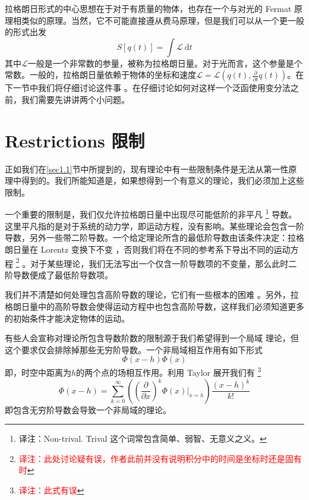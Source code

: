 拉格朗日形式的中心思想在于对于有质量的物体，也存在一个与对光的 Fermat 原理相类似的原理。当然，它不可能直接遵从费马原理，但是我们可以从一个更一般的形式出发
\[
S[q(t)]=\int {\mathcal L}~{\mathrm d}t
\]
其中\(\mathcal L\)一般是一个非常数的参量，被称为拉格朗日量。对于光而言，这个参量是个常数。一般的，拉格朗日量依赖于物体的坐标和速度\({\mathcal L}={\mathcal L}(q(t),\frac{\partial}{\partial t} q(t))\)。在下一节中我们将仔细讨论这件事%
%
。在仔细讨论如何对这样一个泛函使用变分法之前，我们需要先讲讲两个小问题。

\section[限制]{Restrictions 限制}\label{sec4.2}
正如我们在\ref{sec1.1}节中所提到的，现有理论中有一些限制条件是无法从第一性原理中得到的。我们所能知道是，如果想得到一个有意义的理论，我们必须加上这些限制。

一个重要的限制是，我们仅允许拉格朗日量中出现尽可能低阶的非平凡%
\footnote{译注：Non-trival. Trival 这个词常包含简单、弱智、无意义之义。}%
导数。这里平凡指的是对于系统的动力学，即运动方程，没有影响。某些理论会包含一阶导数，另外一些带二阶导数。一个给定理论所含的最低阶导数由该条件决定：拉格朗日量在 Lorentz 变换下不变%
%
，否则我们将在不同的参考系下导出不同的运动方程%
\footnote{\textcolor{red}{译注：此处讨论疑有误，作者此前并没有说明积分中的时间是坐标时还是固有时}}%
。对于某些理论，我们无法写出一个仅含一阶导数项的不变量，那么此时二阶导数便成了最低阶导数项。

我们并不清楚如何处理包含高阶导数的理论，它们有一些根本的困难%
%
。另外，拉格朗日量中的高阶导数会使得运动方程中也包含高阶导数，这样我们必须知道更多的初始条件才能决定物体的运动。

有些人会宣称对理论所包含导数阶数的限制源于我们希望得到一个局域%
%
理论，但这个要求仅会排除掉那些无穷阶导数。一个非局域相互作用有如下形式%
\begin{equation}
\Phi(x-h)\Phi(x)
\end{equation}
即，时空中距离为\(h\)的两个点的场相互作用。利用 Taylor 展开我们有%
\footnote{\textcolor{red}{译注：此式有误}}
\begin{equation}
\Phi(x-h) = \sum\limits_{k=0}^{\infty}\left(\left(\frac{\partial}{\partial x}\right)^k\left.\Phi(x)\right|_{x=h}\right) \frac{(x-h)^k}{k!}
\end{equation}
即包含无穷阶导数会导致一个非局域的理论。

